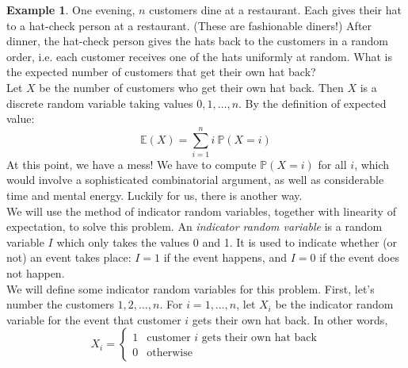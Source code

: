 \documentclass[12pt]{article}
\theoremstyle{definition}
\newtheorem*{example}{Example}
\theoremstyle{remark}
\def\P{{\mathbb P}}
\def\E{{\mathbb E}}
\begin{document}
\begin{example}
One evening, $n$ customers dine at a restaurant. Each gives their hat to a hat-check person at a restaurant. (These are fashionable diners!) After dinner, the hat-check person gives the hats back to the customers in a random order, i.e. each customer receives one of the hats uniformly at random. What is the expected number of customers that get their own hat back?\\

Let $X$ be the number of customers who get their own hat back. Then $X$ is a discrete random variable taking values $0, 1, \dots, n$. By the definition of expected value:
\[
\E(X) = \sum_{i = 1}^n i \:\P(X = i)
\]
At this point, we have a mess! We have to compute $\P(X = i)$ for all $i$, which would involve a sophisticated combinatorial argument, as well as considerable time and mental energy. Luckily for us, there is another way.\\

We will use the method of indicator random variables, together with linearity of expectation, to solve this problem. An \emph{indicator random variable} is a random variable $I$ which only takes the values 0 and 1. It is used to indicate whether (or not) an event takes place: $I = 1$ if the event happens, and $I = 0$ if the event does not happen.\\

We will define some indicator random variables for this problem. First, let's number the customers $1, 2, \dots, n$.
For $i = 1, \dots, n$, let $X_i$ be the indicator random variable for the event that customer $i$ gets their own hat back. In other words,
\[
X_i = \begin{cases}1 & \text{customer $i$ gets their own hat back}\\
0 & \text{otherwise}\end{cases}
\]


\end{example}
\end{document}
